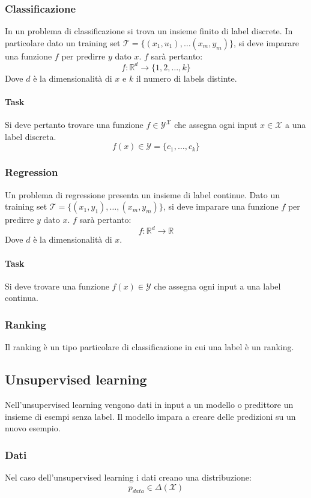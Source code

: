 		\subsubsection{Classificazione}
		In un problema di classificazione si trova un insieme finito di label discrete.
		In particolare dato un training set $\mathcal{T} = \{(x_1, u_1),\dots(x_m, y_m)\}$, si deve imparare una funzione $f$ per predirre $y$ dato $x$.
		$f$ sar\`a pertanto:
		$$f:\mathbb{R}^d \rightarrow\{1, 2, \dots, k\}$$
		Dove $d$ \`e la dimensionalit\`a di $x$ e $k$ il numero di labels distinte.

			\paragraph{Task}
			Si deve pertanto trovare una funzione $f\in\mathcal{Y^X}$ che assegna ogni input $x\in\mathcal{X}$ a una label discreta.
			$$f(x)\in\mathcal{Y}=\{c_1,\dots,c_k\}$$

		\subsubsection{Regression}
		Un problema di regressione presenta un insieme di label continue.
		Dato un training set $\mathcal{T}=\{(x_1, y_1),\dots,(x_m,y_m)\}$, si deve imparare una funzione $f$ per predirre $y$ dato $x$.
		$f$ sar\`a pertanto:
		$$f:\mathbb{R}^d\rightarrow\mathbb{R}$$
		Dove $d$ \`e la dimensionalit\`a di $x$.

			\paragraph{Task}
			Si deve trovare una funzione $f(x)\in\mathcal{Y}$ che assegna ogni input a una label continua.

		\subsubsection{Ranking}
		Il ranking \`e un tipo particolare di classificazione in cui una label \`e un ranking.

	\subsection{Unsupervised learning}
	Nell'unsupervised learning vengono dati in input a un modello o predittore un insieme di esempi senza label.
	Il modello impara a creare delle predizioni su un nuovo esempio.

		\subsubsection{Dati}
		Nel caso dell'unsupervised learning i dati creano una distribuzione:
		$$p_{data}\in\Delta(\mathcal{X})$$

